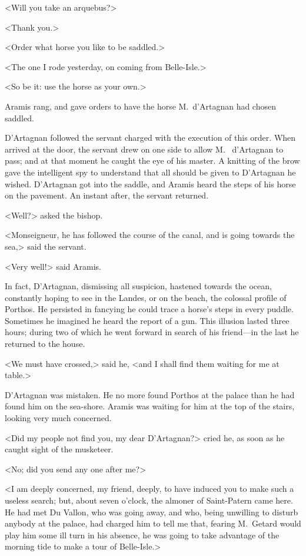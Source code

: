 <Will you take an arquebus?>

<Thank you.>

<Order what horse you like to be saddled.>

<The one I rode yesterday, on coming from Belle-Isle.>

<So be it: use the horse as your own.>

Aramis rang, and gave orders to have the horse M.~d'Artagnan had chosen saddled.

D'Artagnan followed the servant charged with the execution of this order. When arrived at the door, the servant drew on one side to allow M.~ d'Artagnan to pass; and at that moment he caught the eye of his master. A knitting of the brow gave the intelligent spy to understand that all should be given to D'Artagnan he wished. D'Artagnan got into the saddle, and Aramis heard the steps of his horse on the pavement. An instant after, the servant returned.

<Well?> asked the bishop.

<Monseigneur, he has followed the course of the canal, and is going towards the sea,> said the servant.

<Very well!> said Aramis.

In fact, D'Artagnan, dismissing all suspicion, hastened towards the ocean, constantly hoping to see in the Landes, or on the beach, the colossal profile of Porthos. He persisted in fancying he could trace a horse's steps in every puddle. Sometimes he imagined he heard the report of a gun. This illusion lasted three hours; during two of which he went forward in search of his friend—in the last he returned to the house.

<We must have crossed,> said he, <and I shall find them waiting for me at table.>

D'Artagnan was mistaken. He no more found Porthos at the palace than he had found him on the sea-shore. Aramis was waiting for him at the top of the stairs, looking very much concerned.

<Did my people not find you, my dear D'Artagnan?> cried he, as soon as he caught sight of the musketeer.

<No; did you send any one after me?>

<I am deeply concerned, my friend, deeply, to have induced you to make such a useless search; but, about seven o'clock, the almoner of Saint-Patern came here. He had met Du Vallon, who was going away, and who, being unwilling to disturb anybody at the palace, had charged him to tell me that, fearing M.~Getard would play him some ill turn in his absence, he was going to take advantage of the morning tide to make a tour of Belle-Isle.>

